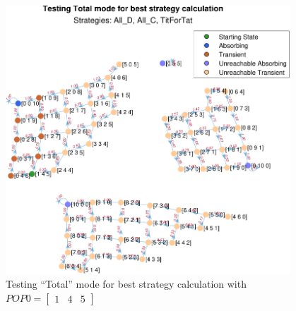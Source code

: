 \documentclass[12pt]{article}
\begin{document}
	\begin{figure}[h]
	      \centering
	      \includegraphics[width=0.95\textwidth]{Testing Total mode for best strategy calculation}
	      \caption{Testing ``Total'' mode for best strategy calculation with $POP0=\begin{bmatrix}1&4&5\end{bmatrix}$}
	      \label{fig:TourTheImiTotal}
	\end{figure}

\clearpage
\end{document}
